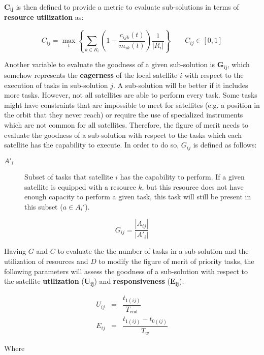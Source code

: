 $\mathbf{C_{ij}}$ is then defined to provide a metric to evaluate sub-solutions in terms of \textbf{resource utilization} as:

\begin{equation}
C_{ij} = \max_{t}\left\lbrace \sum_{k \in R_i}\left(1-\dfrac{c_{ijk}(t)}{m_{ik}(t)}\right)\dfrac{1}{|R_i|}\right\rbrace \qquad C_{ij} \in \left[0,1\right]
\end{equation}

Another variable to evaluate the goodness of a given sub-solution is $\mathbf{G_{ij}}$, which somehow represents the \textbf{eagerness} of the local satellite $i$ with respect to the execution of tasks in sub-solution $j$. A sub-solution will be better if it includes more tasks. However, not all satellites are able to perform every task. Some tasks might have constraints that are impossible to meet for satellites (e.g. a position in the orbit that they never reach) or require the use of specialized instruments which are not common for all satellites. Therefore, the figure of merit needs to evaluate the goodness of a sub-solution with respect to the tasks which each satellite has the capability to execute. In order to do so, $G_{ij}$ is defined as follows:
\begin{description}
\item[$A'_i$] Subset of tasks that satellite $i$ has the capability to perform. If a given satellite is equipped with a resource $k$, but this resource does not have enough capacity to perform a given task, this task will still be present in this subset ($a \in A_i'$).
\end{description}

\begin{equation}
G_{ij} = \dfrac{|A_{ij}|}{|A'_i|}
\end{equation}

Having $G$ and $C$ to evaluate the the number of tasks in a sub-solution and the utilization of resources and $D$ to modify the figure of merit of priority tasks, the following parameters will assess the goodness of a sub-solution with respect to the satellite \textbf{utilization} ($\mathbf{U_{ij}}$) and \textbf{responsiveness} ($\mathbf{E_{ij}}$). 

\begin{eqnarray}
U_{ij} &=& \dfrac{t_{1(ij)}}{T_\text{end}}\\
E_{ij} &=& \dfrac{t_{1(ij)}-t_{0(ij)}}{T_w}
\end{eqnarray}

Where

